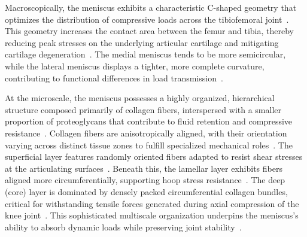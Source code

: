 Macroscopically, the meniscus exhibits a characteristic C-shaped geometry that optimizes the distribution of compressive loads across the tibiofemoral joint~\cite{makris2011kneemeniscus, athanasiou2009engineeringknee, baek2015meniscustissue}.
This geometry increases the contact area between the femur and tibia, thereby reducing peak stresses on the underlying articular cartilage and mitigating cartilage degeneration~\cite{makris2011kneemeniscus, abdelgaied2015comparisonbiomechanical, baek2015meniscustissue}.
The medial meniscus tends to be more semicircular, while the lateral meniscus displays a tighter, more complete curvature, contributing to functional differences in load transmission~\cite{makris2011kneemeniscus, athanasiou2009engineeringknee, baek2015meniscustissue}.

At the microscale, the meniscus possesses a highly organized, hierarchical structure composed primarily of collagen fibers, interspersed with a smaller proportion of proteoglycans that contribute to fluid retention and compressive resistance~\cite{makris2011kneemeniscus, athanasiou2009engineeringknee, baek2015meniscustissue, abdelgaied2015comparisonbiomechanical}.
Collagen fibers are anisotropically aligned, with their orientation varying across distinct tissue zones to fulfill specialized mechanical roles~\cite{makris2011kneemeniscus, baek2015meniscustissue, abdelgaied2015comparisonbiomechanical}.
The superficial layer features randomly oriented fibers adapted to resist shear stresses at the articulating surfaces~\cite{makris2011kneemeniscus, baek2015meniscustissue}.
Beneath this, the lamellar layer exhibits fibers aligned more circumferentially, supporting hoop stress resistance~\cite{makris2011kneemeniscus, baek2015meniscustissue}.
The deep (core) layer is dominated by densely packed circumferential collagen bundles, critical for withstanding tensile forces generated during axial compression of the knee joint~\cite{makris2011kneemeniscus, baek2015meniscustissue, abdelgaied2015comparisonbiomechanical}.
This sophisticated multiscale organization underpins the meniscus's ability to absorb dynamic loads while preserving joint stability~\cite{makris2011kneemeniscus, athanasiou2009engineeringknee, baek2015meniscustissue, abdelgaied2015comparisonbiomechanical}.

